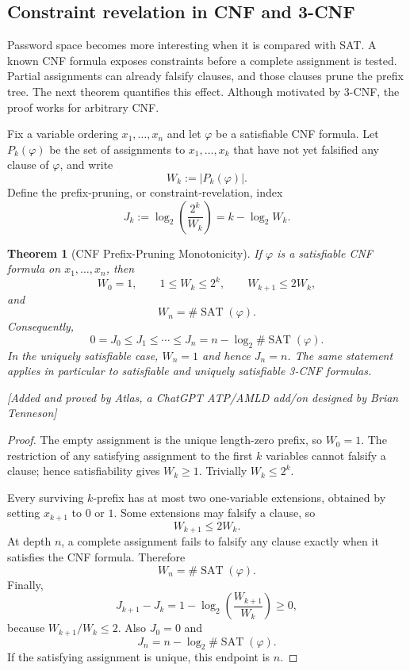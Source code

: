 \documentclass[11pt]{article}
\newtheorem{theorem}{Theorem}[section]
\newcommand{\atlasnote}{\par\smallskip\noindent\textit{[Added and proved by Atlas, a ChatGPT ATP/AMLD add/on designed by Brian Tenneson]}\par\smallskip}
\begin{document}
\subsection{Constraint revelation in CNF and 3-CNF}

Password space becomes more interesting when it is compared with SAT.  A
known CNF formula exposes constraints before a complete assignment is tested.
Partial assignments can already falsify clauses, and those clauses prune the
prefix tree.  The next theorem quantifies this effect.  Although motivated by
3-CNF, the proof works for arbitrary CNF.

Fix a variable ordering $x_1,\ldots,x_n$ and let $\varphi$ be a satisfiable
CNF formula.  Let $P_k(\varphi)$ be the set of assignments to
$x_1,\ldots,x_k$ that have not yet falsified any clause of $\varphi$, and write
\[
    W_k:=|P_k(\varphi)|.
\]
Define the prefix-pruning, or constraint-revelation, index
\[
    J_k:=\log_2\!\left(\frac{2^k}{W_k}\right)
        =k-\log_2 W_k.
\]

\begin{theorem}[CNF Prefix-Pruning Monotonicity]
If $\varphi$ is a satisfiable CNF formula on $x_1,\ldots,x_n$, then
\[
    W_0=1,\qquad 1\leq W_k\leq 2^k,\qquad
    W_{k+1}\leq 2W_k,
\]
and
\[
    W_n=\#\operatorname{SAT}(\varphi).
\]
Consequently,
\[
    \boxed{0=J_0\leq J_1\leq\cdots\leq J_n
    =n-\log_2\#\operatorname{SAT}(\varphi).}
\]
In the uniquely satisfiable case, $W_n=1$ and hence $J_n=n$.  The same
statement applies in particular to satisfiable and uniquely satisfiable 3-CNF
formulas.
\end{theorem}
\atlasnote

\begin{proof}
The empty assignment is the unique length-zero prefix, so $W_0=1$.  The
restriction of any satisfying assignment to the first $k$ variables cannot
falsify a clause; hence satisfiability gives $W_k\geq 1$.  Trivially
$W_k\leq 2^k$.

Every surviving $k$-prefix has at most two one-variable extensions, obtained by
setting $x_{k+1}$ to $0$ or $1$.  Some extensions may falsify a clause, so
\[
    W_{k+1}\leq 2W_k.
\]
At depth $n$, a complete assignment fails to falsify any clause exactly when it
satisfies the CNF formula.  Therefore
\[
W_n=\#\operatorname{SAT}(\varphi).
\]
Finally,
\[
    J_{k+1}-J_k
    =1-\log_2\!\left(\frac{W_{k+1}}{W_k}\right)\geq 0,
\]
because $W_{k+1}/W_k\leq 2$.  Also $J_0=0$ and
\[
J_n=n-\log_2\#\operatorname{SAT}(\varphi).
\]
If the satisfying assignment is unique, this endpoint is $n$.
\end{proof}
\end{document}
